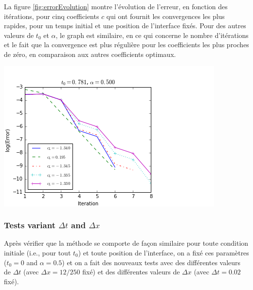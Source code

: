 \endgroup

\indent La figure \ref{fig:errorEvolution} montre l'évolution de l'erreur, en fonction des itérations, pour cinq coefficients $c$ qui ont fournit les convergences les plus rapides, pour un temps initial et une position de l'interface fixés. Pour des autres valeurs de $t_0$ et $\alpha$, le graph est similaire, en ce qui concerne le nombre d'itérations et le fait que la convergence est plus régulière pour les coefficients les plus proches de zéro, en comparaison aux autres coefficients optimaux.

\begingroup
\begin{center}
\includegraphics[scale=.5]{figures/FinalFigures/errorEvolutionFixedT0BFinalVersion.png}
\end{center}
\endgroup

\subsubsection{Tests variant $\Delta t$ and $\Delta x$}

\indent Après vérifier que la méthode se comporte de façon similaire pour toute condition initiale (i.e., pour tout $t_0$) et toute position de l'interface, on a fixé ces paramètres ($t_0 = 0$ and $\alpha = 0.5$) et on a fait des nouveaux tests avec des différentes valeurs de $\Delta t$ (avec $\Delta x = 12/250$ fixé) et des différentes valeurs de $\Delta x$ (avec $\Delta t = 0.02$ fixé).

